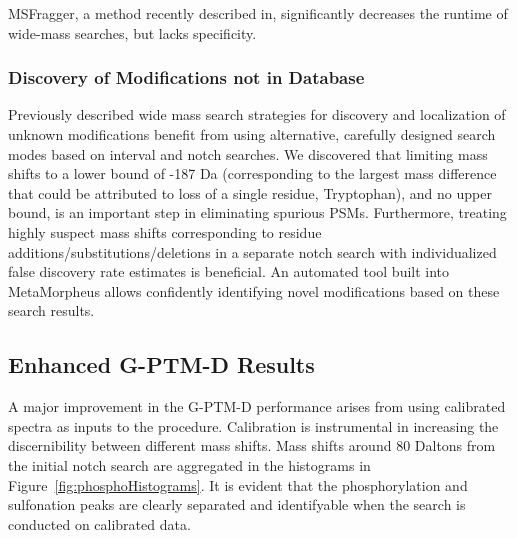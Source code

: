 \documentclass[journal=jprobs,manuscript=article]{achemso}
\begin{document}
MSFragger, a method recently described in\cite{Kong_2017}, significantly decreases the runtime of wide-mass searches, but lacks specificity.


\subsubsection{Discovery of Modifications not in Database}

Previously described wide mass search strategies for discovery and localization of unknown modifications benefit from using alternative, carefully designed search modes based on interval and notch searches.
We discovered that limiting mass shifts to a lower bound of -187 Da (corresponding to the largest mass difference that could be attributed to loss of a single residue, Tryptophan), and no upper bound, is an important step in eliminating spurious PSMs.
Furthermore, treating highly suspect mass shifts corresponding to residue additions/substitutions/deletions in a separate notch search with individualized false discovery rate estimates is beneficial.
An automated tool built into MetaMorpheus allows confidently identifying novel modifications based on these search results.

\subsection{Enhanced G-PTM-D Results}

A major improvement in the G-PTM-D performance arises from using calibrated spectra as inputs to the procedure. Calibration is instrumental in increasing the discernibility between different mass shifts. Mass shifts around 80 Daltons from the initial notch search are aggregated in the histograms in Figure~\ref{fig:phosphoHistograms}. It is evident that the phosphorylation and sulfonation peaks are clearly separated and identifyable when the search is conducted on calibrated data.
\end{document}
